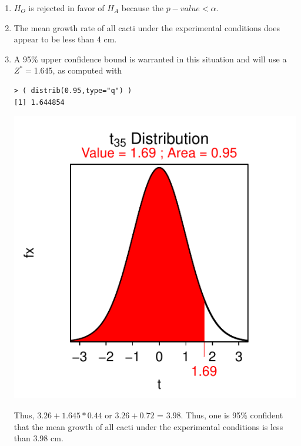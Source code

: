\documentclass[10pt,openany]{book}\usepackage[]{graphicx}\usepackage[]{color}
\makeatletter
\newenvironment{kframe}{%
 \def\at@end@of@kframe{}%
 \ifinner\ifhmode%
  \def\at@end@of@kframe{\end{minipage}}%
  \begin{minipage}{\columnwidth}%
 \fi\fi%
 \def\FrameCommand##1{\hskip\@totalleftmargin \hskip-\fboxsep
 \colorbox{shadecolor}{##1}\hskip-\fboxsep
     \hskip-\linewidth \hskip-\@totalleftmargin \hskip\columnwidth}%
 \MakeFramed {\advance\hsize-\width
   \@totalleftmargin\z@ \linewidth\hsize
   \@setminipage}}%
 {\par\unskip\endMakeFramed%
 \at@end@of@kframe}
\newenvironment{knitrout}{}{} %
\makeatother
\begin{document}
\begin{itemize}
\begin{enumerate}
\begin{knitrout}
{}



\end{knitrout}
      \item $H_{O}$ is rejected in favor of $H_{A}$ because the $p-value<\alpha$.
      \item The mean growth rate of all cacti under the experimental conditions does appear to be less than 4 cm.
      \item A 95\% upper confidence bound is warranted in this situation and will use a $Z^{*}=$1.645, as computed with
\begin{knitrout}
\color{fgcolor}\begin{kframe}
\begin{verbatim}
> ( distrib(0.95,type="q") )
[1] 1.644854
\end{verbatim}
\end{kframe}

{\centering \includegraphics[width=.4\linewidth]{Figs/unnamed-chunk-355-1} 

}



\end{knitrout}
Thus, $3.26+1.645*0.44$ or $3.26+0.72$ = $3.98$.  Thus, one is 95\% confident that the mean growth of all cacti under the experimental conditions is less than 3.98 cm.
    \end{enumerate}


\end{itemize}
\end{document}
